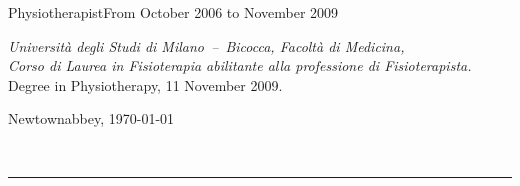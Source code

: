 \documentclass{article}
\newcommand{\universita}[4]{{\fontsize{14pt}{17pt}\selectfont#1}\hfill#2\\
    \begin{adjustwidth}{28pt}{28pt}
    \textit{#3}\\
    #4\\[14pt]
    \end{adjustwidth}}
\begin{document}
\universita{Physiotherapist}{From October 2006 to November 2009}%
{Universit\`a degli Studi di Milano~--~Bicocca, Facolt\`a di Medicina,\\ Corso di Laurea in Fisioterapia abilitante alla professione di Fisioterapista.}%
{Degree in Physiotherapy, 11 November 2009.}

\vfill
\null\hfill Newtownabbey, \today\\[-7pt]
\null\hfill\begin{minipage}{0.5\linewidth}\centering
\resizebox{0.8\linewidth}{!}{}\\[-16pt]
\rule{\linewidth}{0.5pt}
\end{minipage}
\end{document}
